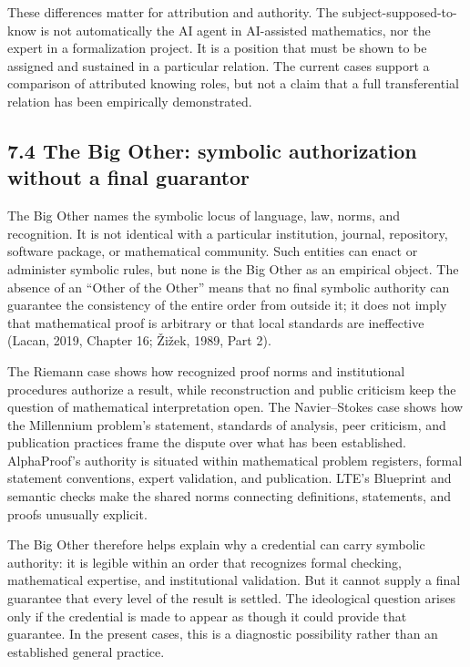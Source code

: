 \documentclass[sn-apa]{sn-jnl}
\begin{document}
These differences matter for attribution and authority. The subject-supposed-to-know is not automatically the AI agent in AI-assisted mathematics, nor the expert in a formalization project. It is a position that must be shown to be assigned and sustained in a particular relation. The current cases support a comparison of attributed knowing roles, but not a claim that a full transferential relation has been empirically demonstrated.

\subsection{7.4 The Big Other: symbolic authorization without a final guarantor}

The Big Other names the symbolic locus of language, law, norms, and recognition. It is not identical with a particular institution, journal, repository, software package, or mathematical community. Such entities can enact or administer symbolic rules, but none is the Big Other as an empirical object. The absence of an “Other of the Other” means that no final symbolic authority can guarantee the consistency of the entire order from outside it; it does not imply that mathematical proof is arbitrary or that local standards are ineffective (Lacan, 2019, Chapter 16; Žižek, 1989, Part 2).

The Riemann case shows how recognized proof norms and institutional procedures authorize a result, while reconstruction and public criticism keep the question of mathematical interpretation open. The Navier–Stokes case shows how the Millennium problem’s statement, standards of analysis, peer criticism, and publication practices frame the dispute over what has been established. AlphaProof’s authority is situated within mathematical problem registers, formal statement conventions, expert validation, and publication. LTE’s Blueprint and semantic checks make the shared norms connecting definitions, statements, and proofs unusually explicit.

The Big Other therefore helps explain why a credential can carry symbolic authority: it is legible within an order that recognizes formal checking, mathematical expertise, and institutional validation. But it cannot supply a final guarantee that every level of the result is settled. The ideological question arises only if the credential is made to appear as though it could provide that guarantee. In the present cases, this is a diagnostic possibility rather than an established general practice.
\end{document}
